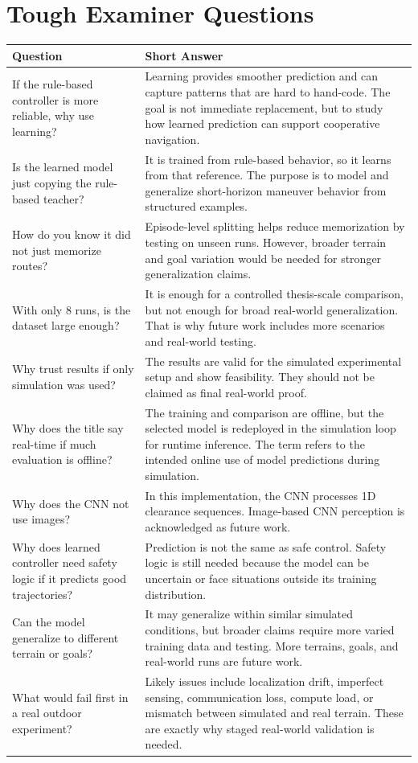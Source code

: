 \documentclass[11pt,a4paper]{article}
\begin{document}
\section*{Tough Examiner Questions}
\begin{longtable}{QA}
\toprule
\textbf{Question} & \textbf{Short Answer} \\
\midrule
\endhead
If the rule-based controller is more reliable, why use learning? &
Learning provides smoother prediction and can capture patterns that are hard to hand-code. The goal is not immediate replacement, but to study how learned prediction can support cooperative navigation. \\
\addlinespace
Is the learned model just copying the rule-based teacher? &
It is trained from rule-based behavior, so it learns from that reference. The purpose is to model and generalize short-horizon maneuver behavior from structured examples. \\
\addlinespace
How do you know it did not just memorize routes? &
Episode-level splitting helps reduce memorization by testing on unseen runs. However, broader terrain and goal variation would be needed for stronger generalization claims. \\
\addlinespace
With only 8 runs, is the dataset large enough? &
It is enough for a controlled thesis-scale comparison, but not enough for broad real-world generalization. That is why future work includes more scenarios and real-world testing. \\
\addlinespace
Why trust results if only simulation was used? &
The results are valid for the simulated experimental setup and show feasibility. They should not be claimed as final real-world proof. \\
\addlinespace
Why does the title say real-time if much evaluation is offline? &
The training and comparison are offline, but the selected model is redeployed in the simulation loop for runtime inference. The term refers to the intended online use of model predictions during simulation. \\
\addlinespace
Why does the CNN not use images? &
In this implementation, the CNN processes 1D clearance sequences. Image-based CNN perception is acknowledged as future work. \\
\addlinespace
Why does learned controller need safety logic if it predicts good trajectories? &
Prediction is not the same as safe control. Safety logic is still needed because the model can be uncertain or face situations outside its training distribution. \\
\addlinespace
Can the model generalize to different terrain or goals? &
It may generalize within similar simulated conditions, but broader claims require more varied training data and testing. More terrains, goals, and real-world runs are future work. \\
\addlinespace
What would fail first in a real outdoor experiment? &
Likely issues include localization drift, imperfect sensing, communication loss, compute load, or mismatch between simulated and real terrain. These are exactly why staged real-world validation is needed. \\
\bottomrule
\end{longtable}
\end{document}
